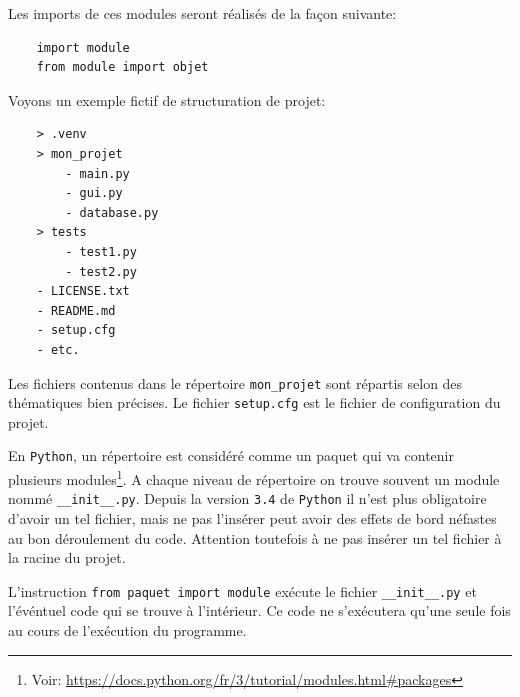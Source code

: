 \documentclass[a4paper,12pt]{book}
\begin{document}
Les imports de ces modules seront réalisés de la façon suivante:
\begin{verbatim}
    import module
    from module import objet
\end{verbatim}
\medskip

Voyons un exemple fictif de structuration de projet:
\begin{verbatim}
    > .venv
    > mon_projet
        - main.py
        - gui.py
        - database.py
    > tests
        - test1.py
        - test2.py
    - LICENSE.txt
    - README.md
    - setup.cfg
    - etc.
\end{verbatim}
\medskip

Les fichiers contenus dans le répertoire \texttt{mon\_projet} sont répartis selon des thématiques bien précises. Le fichier \texttt{setup.cfg} est le fichier de configuration du projet.
\medskip

En \texttt{Python}, un répertoire est considéré comme un paquet qui va contenir plusieurs modules\footnote{Voir: \url{https://docs.python.org/fr/3/tutorial/modules.html\#packages}}. A chaque niveau de répertoire on trouve souvent un module nommé \texttt{\_\_init\_\_.py}. Depuis la version \texttt{3.4} de \texttt{Python} il n'est plus obligatoire d'avoir un tel fichier, mais ne pas l'insérer peut avoir des effets de bord néfastes au bon déroulement du code. Attention toutefois à ne pas insérer un tel fichier à la racine du projet.
\medskip

L'instruction \texttt{from paquet import module} exécute le fichier \texttt{\_\_init\_\_.py} et l'événtuel code qui se trouve à l'intérieur. Ce code ne s'exécutera qu'une seule fois au cours de l'exécution du programme.
\medskip
\end{document}
